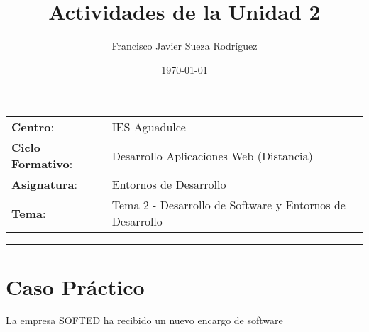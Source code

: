 


\title{
    \vspace{10ex}
    \normalfont \normalsize
    \huge \textbf{Actividades de la Unidad 2}
}
\author{Francisco Javier Sueza Rodríguez}
\date{\normalsize\today}



\maketitle

\thispagestyle{empty}

\vspace{75ex}

\begin{center}
    \begin{tabular}{l l}
        \textbf{Centro}: & IES Aguadulce \\
        \textbf{Ciclo Formativo}: & Desarrollo Aplicaciones Web (Distancia)\\
        \textbf{Asignatura}: & Entornos de Desarrollo\\
       \textbf{Tema}: & Tema 2 - Desarrollo de Software y Entornos de Desarrollo\\
    \end{tabular}
\end{center}

\newpage

\tableofcontents

\vspace{15ex}

\hrule

\vspace{10ex}

\listoffigures

\newpage

\section{Caso Práctico}
La empresa SOFTED ha recibido un nuevo encargo de software

